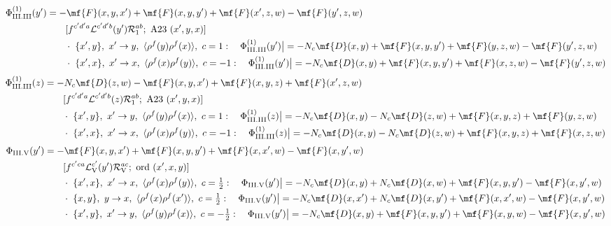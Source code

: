 \begin{align}
\Phi_{\rm III.III}^{(1)}(y')&=-\mf{F}(x,y,x')+\mf{F}(x,y,y')+\mf{F}(x',z,w)-\mf{F}(y',z,w)\notag\\&\qquad[f^{c'd'a}\mathcal{L}^{c'd'b}(y')\mathcal{R}_{1}^{ab};\ \text{A23}\ (x',y,x)]\notag\\
&\qquad\cdot\ \{x',y\},\ x'\to y,\ \langle\rho^{f}(y)\rho^{f}(x)\rangle,\ c=1:\quad \Phi_{\rm III.III}^{(1)}(y')\big|=-N_{c}\mf{D}(x,y)+\mf{F}(x,y,y')+\mf{F}(y,z,w)-\mf{F}(y',z,w)\notag\\
&\qquad\cdot\ \{x',x\},\ x'\to x,\ \langle\rho^{f}(x)\rho^{f}(y)\rangle,\ c=-1:\quad \Phi_{\rm III.III}^{(1)}(y')\big|=-N_{c}\mf{D}(x,y)+\mf{F}(x,y,y')+\mf{F}(x,z,w)-\mf{F}(y',z,w)\notag
\end{align}
\begin{align}
\Phi_{\rm III.III}^{(1)}(z)&=-N_{c}\mf{D}(z,w)-\mf{F}(x,y,x')+\mf{F}(x,y,z)+\mf{F}(x',z,w)\notag\\&\qquad[f^{c'd'a}\mathcal{L}^{c'd'b}(z)\mathcal{R}_{1}^{ab};\ \text{A23}\ (x',y,x)]\notag\\
&\qquad\cdot\ \{x',y\},\ x'\to y,\ \langle\rho^{f}(y)\rho^{f}(x)\rangle,\ c=1:\quad \Phi_{\rm III.III}^{(1)}(z)\big|=-N_{c}\mf{D}(x,y)-N_{c}\mf{D}(z,w)+\mf{F}(x,y,z)+\mf{F}(y,z,w)\notag\\
&\qquad\cdot\ \{x',x\},\ x'\to x,\ \langle\rho^{f}(x)\rho^{f}(y)\rangle,\ c=-1:\quad \Phi_{\rm III.III}^{(1)}(z)\big|=-N_{c}\mf{D}(x,y)-N_{c}\mf{D}(z,w)+\mf{F}(x,y,z)+\mf{F}(x,z,w)\notag
\end{align}
\begin{align}
\Phi_{\rm III.V}(y')&=-\mf{F}(x,y,x')+\mf{F}(x,y,y')+\mf{F}(x,x',w)-\mf{F}(x,y',w)\notag\\&\qquad[f^{c'ca}\mathcal{L}_{\rm V}^{c'}(y')\mathcal{R}_{\rm V}^{ac};\ \text{ord}\ (x',x,y)]\notag\\
&\qquad\cdot\ \{x',x\},\ x'\to x,\ \langle\rho^{f}(x)\rho^{f}(y)\rangle,\ c=\tfrac{1}{2}:\quad \Phi_{\rm III.V}(y')\big|=-N_{c}\mf{D}(x,y)+N_{c}\mf{D}(x,w)+\mf{F}(x,y,y')-\mf{F}(x,y',w)\notag\\
&\qquad\cdot\ \{x,y\},\ y\to x,\ \langle\rho^{f}(x)\rho^{f}(x')\rangle,\ c=\tfrac{1}{2}:\quad \Phi_{\rm III.V}(y')\big|=-N_{c}\mf{D}(x,x')+N_{c}\mf{D}(x,y')+\mf{F}(x,x',w)-\mf{F}(x,y',w)\notag\\
&\qquad\cdot\ \{x',y\},\ x'\to y,\ \langle\rho^{f}(y)\rho^{f}(x)\rangle,\ c=-\tfrac{1}{2}:\quad \Phi_{\rm III.V}(y')\big|=-N_{c}\mf{D}(x,y)+\mf{F}(x,y,y')+\mf{F}(x,y,w)-\mf{F}(x,y',w)\notag
\end{align}
